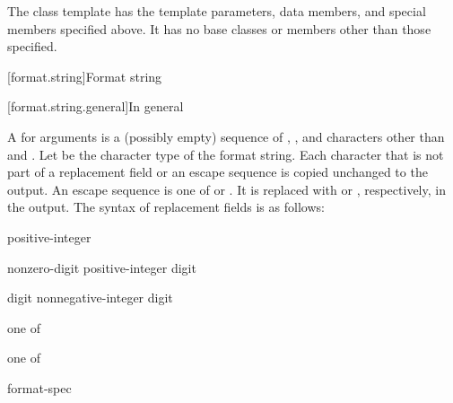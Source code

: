 \pnum
The class template 
has the template parameters, data members, and special members specified above. It has no base classes or members other than those specified.

[format.string]{Format string}

[format.string.general]{In general}

\pnum
A  for arguments  is
a (possibly empty) sequence of
,
,
and characters other than \tcode{\{} and \tcode{\}}.
Let  be the character type of the format string.
Each character that is not part of
a replacement field or an escape sequence
is copied unchanged to the output.
An escape sequence is one of \tcode{\{\{} or \tcode{\}\}}.
It is replaced with \tcode{\{} or \tcode{\}}, respectively, in the output.
The syntax of replacement fields is as follows:

\begin{ncbnf}
\br
    \terminal{\{}   \terminal{\}}
\end{ncbnf}

\begin{ncbnf}
\br
    \br
    positive-integer
\end{ncbnf}

\begin{ncbnf}
\br
    nonzero-digit\br
    positive-integer digit
\end{ncbnf}

\begin{ncbnf}
\br
    digit\br
    nonnegative-integer digit
\end{ncbnf}

\begin{ncbnf}
 \textnormal{one of}\br
\end{ncbnf}

\begin{ncbnf}
 \textnormal{one of}\br
\end{ncbnf}

\begin{ncbnf}
\br
    \terminal{:} format-spec
\end{ncbnf}


